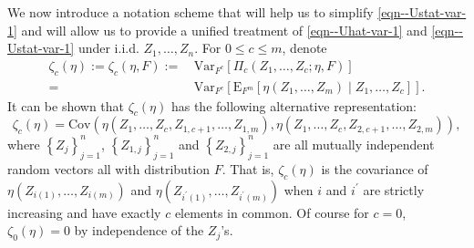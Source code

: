 \documentclass[12pt]{article}
\numberwithin{equation}{section}
\theoremstyle{definition}
\theoremstyle{plain}
\begin{document}
We now introduce a notation scheme that will help us to simplify
\eqref{eqn--Ustat-var-1} and will allow us to provide a unified treatment of
\eqref{eqn--Uhat-var-1} and \eqref{eqn--Ustat-var-1} under i.i.d. \(Z_{1},
\dots, Z_{n}\).
For \(0 \leq c \leq m\), denote
\begin{equation}
  \begin{split}
  \zeta_{c} (\eta) := \zeta_{c} (\eta, F) :=
  & \, \mathrm{Var}_{F^{c}} \left[ \Pi_{c} \left( Z_{1}, \dots,
  Z_{c}; \eta, F \right) \right] \\
  =
  & \, \mathrm{Var}_{F^{c}} \left[ \mathrm{E}_{F^{m}} \left[ \eta \left( Z_{1},
  \dots, Z_{m} \right) \middle| Z_{1}, \dots, Z_{c} \right] \right].
  \end{split}
  \label{eqn--zeta-c}
\end{equation}
It can be shown that \(\zeta_{c} (\eta)\) has the following alternative
representation:
\begin{equation}
  \zeta_{c} (\eta) =
  \mathrm{Cov} \left( \eta \left( Z_{1}, \dots, Z_{c}, Z_{1, c + 1}, \dots,
  Z_{1, m} \right), \eta \left( Z_{1}, \dots, Z_{c}, Z_{2, c + 1}, \dots, Z_{2,
  m} \right) \right),
  \label{eqn--zeta-c-cov-eta-c-common}
\end{equation}
where \(\left\{ Z_{j} \right\}_{j = 1}^{n}\), \(\left\{ Z_{1, j} \right\}_{j =
1}^{n}\) and \(\left\{ Z_{2, j} \right\}_{j = 1}^{n}\) are all mutually
independent random vectors all with distribution \(F\).
That is, \(\zeta_{c} (\eta)\) is the covariance of \(\eta \left( Z_{i (1)},
\dots, Z_{i (m)} \right)\) and \(\eta \left( Z_{i^{\prime} (1)}, \dots,
Z_{i^{\prime} (m)} \right)\) when \(i\) and \(i^{\prime}\) are strictly
increasing and have exactly \(c\) elements in common.
Of course for \(c = 0\), \(\zeta_{0} (\eta) = 0\) by independence of the
\(Z_{j}\)'s.
\end{document}
